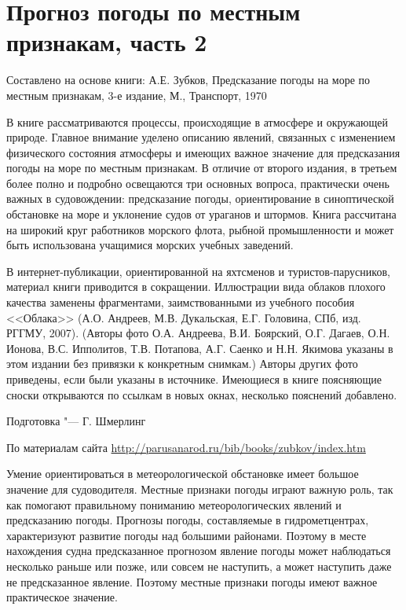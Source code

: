 \section{Прогноз погоды по местным признакам, часть 2}

\footnotesize{}

Составлено на основе книги: А.Е. Зубков, Предсказание погоды на море
по местным признакам, 3-е издание, М., Транспорт, 1970

В книге рассматриваются процессы, происходящие в атмосфере и
окружающей природе. Главное внимание уделено описанию явлений,
связанных с изменением физического состояния атмосферы и имеющих
важное значение для предсказания погоды на море по местным
признакам. В отличие от второго издания, в третьем более полно и
подробно освещаются три основных вопроса, практически очень важных в
судовождении: предсказание погоды, ориентирование в синоптической
обстановке на море и уклонение судов от ураганов и штормов. Книга
рассчитана на широкий круг работников морского флота, рыбной
промышленности и может быть использована учащимися морских учебных
заведений.

В интернет-публикации, ориентированной на яхтсменов и
туристов-парусников, материал книги приводится в
сокращении. Иллюстрации вида облаков плохого качества заменены
фрагментами, заимствованными из учебного пособия <<Облака>>
(А.О. Андреев, М.В. Дукальская, Е.Г. Головина, СПб, изд. РГГМУ,
2007). (Авторы фото О.А. Андреева, В.И. Боярский, О.Г. Дагаев,
О.Н. Ионова, В.С. Ипполитов, Т.В. Потапова, А.Г. Саенко и Н.Н. Якимова
указаны в этом издании без привязки к конкретным снимкам.) Авторы
других фото приведены, если были указаны в источнике. Имеющиеся в
книге поясняющие сноски открываются по ссылкам в новых окнах,
несколько пояснений добавлено.

Подготовка "--- Г. Шмерлинг

По материалам сайта \url{http://parusanarod.ru/bib/books/zubkov/index.htm}

\normalsize{}

Умение ориентироваться в метеорологической обстановке имеет большое
значение для судоводителя. Местные признаки погоды играют важную роль,
так как помогают правильному пониманию метеорологических явлений и
предсказанию погоды. Прогнозы погоды, составляемые в гидрометцентрах,
характеризуют развитие погоды над большими районами. Поэтому в месте
нахождения судна предсказанное прогнозом явление погоды может
наблюдаться несколько раньше или позже, или совсем не наступить, а
может наступить даже не предсказанное явление. Поэтому местные
признаки погоды имеют важное практическое значение.

